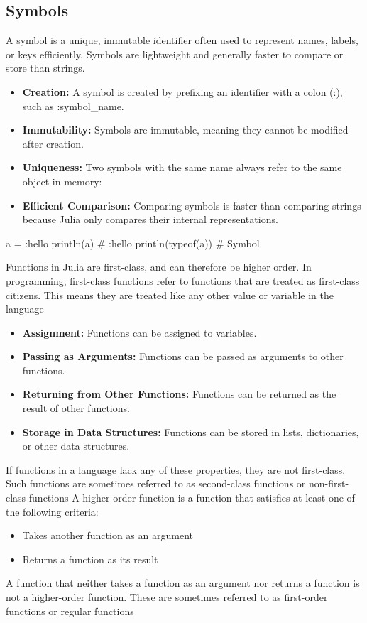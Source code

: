 \documentclass{report}
\begin{document}
    \subsection{Symbols}
    \bigbreak \noindent 
    A symbol is a unique, immutable identifier often used to represent names, labels, or keys efficiently. Symbols are lightweight and generally faster to compare or store than strings.
    \bigbreak \noindent 
    \begin{itemize}
        \item \textbf{Creation:} A symbol is created by prefixing an identifier with a colon (:), such as :symbol_name.
        \item \textbf{Immutability:} Symbols are immutable, meaning they cannot be modified after creation.
        \item \textbf{Uniqueness:} Two symbols with the same name always refer to the same object in memory:
        \item \textbf{Efficient Comparison:} Comparing symbols is faster than comparing strings because Julia only compares their internal representations.
    \end{itemize}
    \bigbreak \noindent 
    \begin{jlcode}
        a = :hello
        println(a) # :hello
        println(typeof(a)) # Symbol
    \end{jlcode}



    \pagebreak 
    \bigbreak \noindent 
    Functions in Julia are first-class, and can therefore be higher order. In programming, first-class functions refer to functions that are treated as first-class citizens. This means they are treated like any other value or variable in the language
    \begin{itemize}
        \item \textbf{Assignment:} Functions can be assigned to variables.
        \item \textbf{Passing as Arguments:} Functions can be passed as arguments to other functions.
        \item \textbf{Returning from Other Functions:} Functions can be returned as the result of other functions.
        \item \textbf{Storage in Data Structures:} Functions can be stored in lists, dictionaries, or other data structures.
    \end{itemize}
    If functions in a language lack any of these properties, they are not first-class. Such functions are sometimes referred to as second-class functions or non-first-class functions
    \bigbreak \noindent 
    A higher-order function is a function that satisfies at least one of the following criteria:
    \begin{itemize}
        \item Takes another function as an argument
        \item Returns a function as its result
    \end{itemize}
    \bigbreak \noindent 
    A function that neither takes a function as an argument nor returns a function is not a higher-order function. These are sometimes referred to as first-order functions or regular functions
\end{document}
